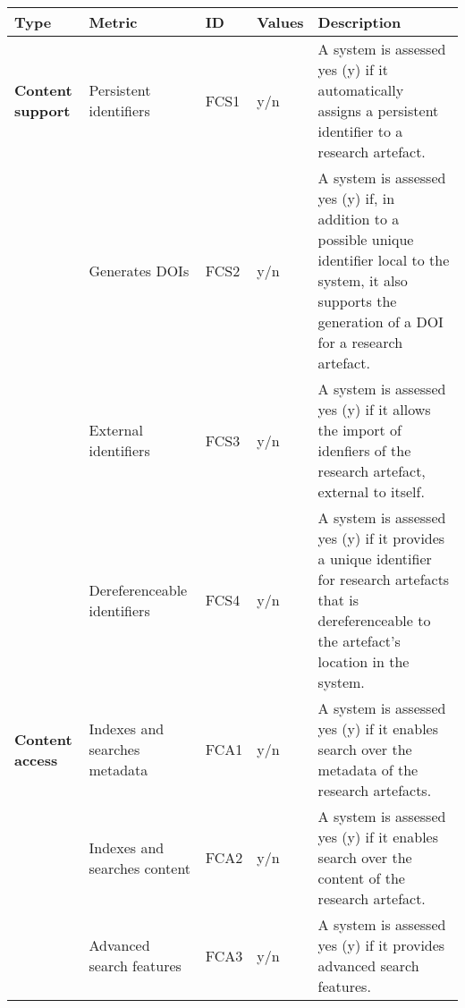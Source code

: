 \begin{tabular}
\end{tabular}


\begin{tabular}{|m{2.5cm}|m{3cm}|m{1cm}|m{1cm}|p{8cm}|}
\hline \textbf{Type}&\textbf{Metric}&\textbf{ID}&\textbf{Values}&\textbf{Description}\\ \hline
\textbf{Content support}&Persistent identifiers&FCS1&y/n&A system is assessed yes (y) if it automatically assigns a persistent identifier to a research artefact.\\ \hline
\textbf{}&Generates DOIs&FCS2&y/n&A system is assessed yes (y) if, in addition to a possible unique identifier local to the system, it also supports the generation of a DOI for a research artefact.\\ \hline
\textbf{}&External identifiers&FCS3&y/n&A system is assessed yes (y) if it allows the import of idenfiers of the research artefact, external to itself.\\ \hline
\textbf{}&Dereferenceable identifiers&FCS4&y/n&A system is assessed yes (y) if it provides a unique identifier for research artefacts that is dereferenceable to the artefact's location in the system.\\ \hline
\textbf{Content access}&Indexes and searches metadata&FCA1&y/n&A system is assessed yes (y) if it enables search over the metadata of the research artefacts.\\ \hline
\textbf{}&Indexes and searches content&FCA2&y/n&A system is assessed yes (y) if it enables search over the content of the research artefact.\\ \hline
\textbf{}&Advanced search features&FCA3&y/n&A system is assessed yes (y) if it provides advanced search features.\\ \hline
\end{tabular}


